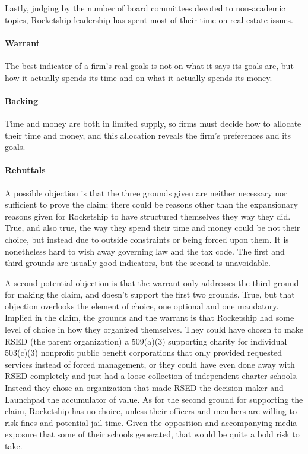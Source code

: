Lastly, judging by the number of board committees devoted to non-academic topics, Rocketship leadership has spent most of their time on real estate issues.

\paragraph{Warrant}
The best indicator of a firm's real goals is not on what it says its goals are, but how it actually spends its time and on what it actually spends its money. 

\paragraph{Backing}
Time and money are both in limited supply, so firms must decide how to allocate their time and money, and this allocation reveals the firm's preferences and its goals.

\paragraph{Rebuttals}
A possible objection is that the three grounds given are neither necessary nor sufficient to prove the claim; there could be reasons other than the expansionary reasons given for Rocketship to have structured themselves they way they did. True, and also true, the way they spend their time and money could be not their choice, but instead due to outside constraints or being forced upon them. It is nonetheless hard to wish away governing law and the tax code. The first and third grounds are usually good indicators, but the second is unavoidable.

A second potential objection is that the warrant only addresses the third ground for making the claim, and doesn't support the first two grounds. True, but that objection overlooks the element of choice, one optional and one mandatory. Implied in the claim, the grounds and the warrant is that Rocketship had some level of choice in how they organized themselves. They could have chosen to make RSED (the parent organization) a 509(a)(3) supporting charity for individual 503(c)(3) nonprofit public benefit corporations that only provided requested services instead of forced management, or they could have even done away with RSED completely and just had a loose collection of independent charter schools. Instead they chose an organization that made RSED the decision maker and Launchpad the accumulator of value. As for the second ground for supporting the claim, Rocketship has no choice, unless their officers and members are willing to risk fines and potential jail time. Given the opposition and accompanying media exposure that some of their schools generated, that would be quite a bold risk to take.

